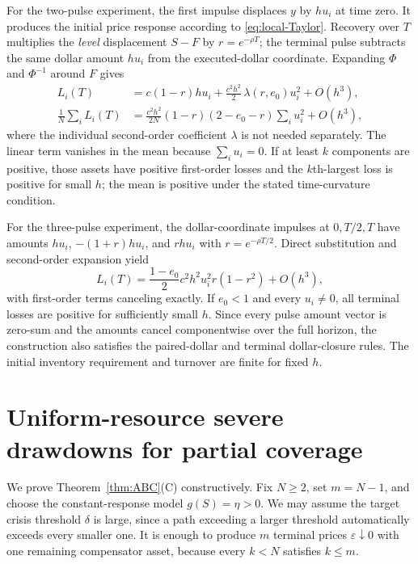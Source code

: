 \documentclass[review,hidelinks,onefignum,onetabnum]{siamonline250211}
\begin{document}
For the two-pulse experiment, the first impulse displaces $y$ by $hu_i$ at time zero. It produces the initial price response according to \eqref{eq:local-Taylor}. Recovery over $T$ multiplies the \emph{level} displacement $S-F$ by $r=e^{-\rho T}$; the terminal pulse subtracts the same dollar amount $hu_i$ from the executed-dollar coordinate. Expanding $\Phi$ and $\Phi^{-1}$ around $F$ gives
\begin{align}\label{eq:local-two}
L_i(T)&=c(1-r)hu_i+\frac{c^2h^2}{2}\,\lambda(r,e_0)u_i^2+O(h^3),\\
\frac1N\sum_i L_i(T)&=\frac{c^2h^2}{2N}(1-r)(2-e_0-r)\sum_i u_i^2+O(h^3),\nonumber
\end{align}
where the individual second-order coefficient $\lambda$ is not needed separately. The linear term vanishes in the mean because $\sum_i u_i=0$. If at least $k$ components are positive, those assets have positive first-order losses and the $k$th-largest loss is positive for small $h$; the mean is positive under the stated time-curvature condition.

For the three-pulse experiment, the dollar-coordinate impulses at $0,T/2,T$ have amounts $hu_i$, $-(1+r)hu_i$, and $rhu_i$ with $r=e^{-\rho T/2}$. Direct substitution and second-order expansion yield
\begin{equation}\label{eq:local-three}
L_i(T)=\frac{1-e_0}{2}c^2h^2u_i^2r(1-r^2)+O(h^3),
\end{equation}
with first-order terms canceling exactly. If $e_0<1$ and every $u_i\ne0$, all terminal losses are positive for sufficiently small $h$. Since every pulse amount vector is zero-sum and the amounts cancel componentwise over the full horizon, the construction also satisfies the paired-dollar and terminal dollar-closure rules. The initial inventory requirement and turnover are finite for fixed $h$.

\section{Uniform-resource severe drawdowns for partial coverage}\label{app:severe}
We prove Theorem~\ref{thm:ABC}(C) constructively. Fix $N\ge2$, set $m=N-1$, and choose the constant-response model $g(S)=\eta>0$. We may assume the target crisis threshold $\delta$ is large, since a path exceeding a larger threshold automatically exceeds every smaller one. It is enough to produce $m$ terminal prices $\varepsilon\downarrow0$ with one remaining compensator asset, because every $k<N$ satisfies $k\le m$.
\end{document}
